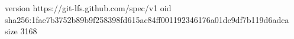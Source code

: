 version https://git-lfs.github.com/spec/v1
oid sha256:1fae7b3752b89b9f258398fd615ac84ff001192346176a01dc9df7b119d6adca
size 3168
